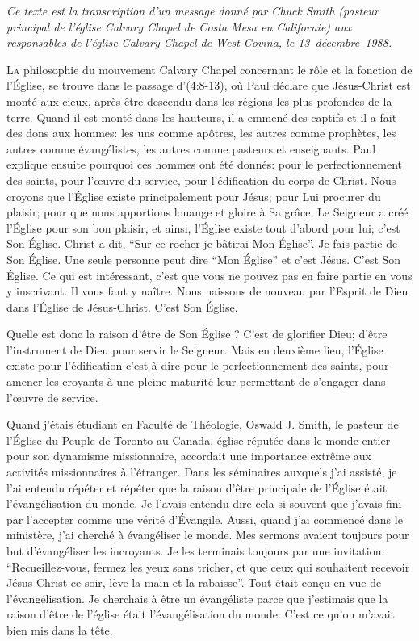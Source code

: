 \epigraph{\textit{%
Ce texte est la transcription d'un message donné par Chuck Smith (pasteur principal de l'église Calvary Chapel de
Costa Mesa en Californie) aux responsables de l'église Calvary Chapel de West Covina, le 13~décembre~1988.
}}{}

\lettrine{L}{a} philosophie du mouvement Calvary Chapel concernant le rôle et la fonction de l’Église, se trouve dans le passage
d'(4:8-13), où Paul déclare que Jésus-Christ est monté aux cieux, après être descendu dans les régions les
plus profondes de la terre. Quand il est monté dans les hauteurs, il a emmené des captifs et il a fait des dons aux
hommes: les uns comme apôtres, les autres comme prophètes, les autres comme évangélistes, les autres comme
pasteurs et enseignants. Paul explique ensuite pourquoi ces hommes ont été donnés: pour le perfectionnement des
saints, pour l’œuvre du service, pour l’édification du corps de Christ. Nous croyons que l’Église existe principalement
pour Jésus; pour Lui procurer du plaisir; pour que nous apportions louange et gloire à Sa grâce. Le Seigneur a créé
l’Église pour son bon plaisir, et ainsi, l’Église existe tout d’abord pour lui; c’est Son Église. Christ a dit, “Sur ce rocher
je bâtirai Mon Église”. Je fais partie de Son Église. Une seule personne peut dire “Mon Église” et c’est Jésus. C’est
Son Église. Ce qui est intéressant, c’est que vous ne pouvez pas en faire partie en vous y inscrivant. Il vous faut y
naître. Nous naissons de nouveau par l’Esprit de Dieu dans l’Église de Jésus-Christ. C’est Son Église.

Quelle est donc la raison d'être de Son Église ? C'est de glorifier Dieu; d’être l’instrument de Dieu pour servir le
Seigneur. Mais en deuxième lieu, l’Église existe pour l’édification c'est-à-dire pour le perfectionnement des saints, pour
amener les croyants à une pleine maturité leur permettant de s’engager dans l’œuvre de service.

Quand j’étais étudiant en Faculté de Théologie, Oswald J. Smith, le pasteur de l’Église du Peuple de Toronto au
Canada, église réputée dans le monde entier pour son dynamisme missionnaire, accordait une importance extrême
aux activités missionnaires à l’étranger. Dans les séminaires auxquels j’ai assisté, je l’ai entendu répéter et répéter
que la raison d'être principale de l’Église était l’évangélisation du monde. Je l’avais entendu dire cela si souvent que
j’avais fini par l’accepter comme une vérité d’Évangile. Aussi, quand j’ai commencé dans le ministère, j’ai cherché à
évangéliser le monde. Mes sermons avaient toujours pour but d'évangéliser les incroyants. Je les terminais toujours
par une invitation: “Recueillez-vous, fermez les yeux sans tricher, et que ceux qui souhaitent recevoir Jésus-Christ ce
soir, lève la main et la rabaisse”. Tout était conçu en vue de l’évangélisation. Je cherchais à être un évangéliste parce
que j’estimais que la raison d'être de l’église était l’évangélisation du monde. C'est ce qu'on m'avait bien mis dans la
tête.

